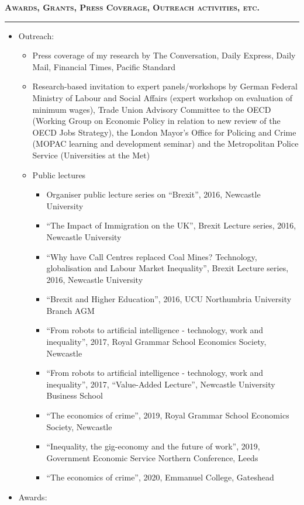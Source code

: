 \documentclass[10pt,pdftex,a4paper,oneside]{article}
\begin{document}
\textbf{\textsc{Awards, Grants, Press Coverage, Outreach activities, etc.}}
\vspace{.5ex}
\hrule
\begin{itemize}[noitemsep,nolistsep]
\item Outreach: 
\begin{itemize}[noitemsep,nolistsep]
	\item Press coverage of my research by The Conversation, Daily Express, Daily Mail, Financial Times, Pacific Standard
	\item Research-based invitation to expert panels/workshops by German Federal Ministry of Labour and Social Affairs (expert workshop on evaluation of minimum wages), Trade Union Advisory Committee to the OECD (Working Group on Economic Policy in relation to new review of the OECD Jobs Strategy), the London Mayor's Office for Policing and Crime (MOPAC learning and development seminar) and the Metropolitan Police Service (Universities at the Met)
	\item Public lectures
	\begin{itemize}	
	\item Organiser public lecture series on ``Brexit'', 2016, Newcastle University
	\item ``The Impact of Immigration on the UK'', Brexit Lecture series, 2016, Newcastle University
	\item ``Why have Call Centres replaced Coal Mines? Technology, globalisation and Labour Market Inequality'', Brexit Lecture series, 2016, Newcastle University
	\item ``Brexit and Higher Education'', 2016, UCU Northumbria University Branch AGM
	\item ``From robots to artificial intelligence - technology, work and inequality'', 2017, Royal Grammar School Economics Society, Newcastle
	\item ``From robots to artificial intelligence - technology, work and inequality'', 2017, ``Value-Added Lecture'', Newcastle University Business School
	\item  ``The economics of crime'', 2019, Royal Grammar School Economics Society, Newcastle
	\item ``Inequality, the gig-economy and the future of work'', 2019, Government Economic Service Northern Conference, Leeds
	\item  ``The economics of crime'', 2020, Emmanuel College, Gateshead
	\end{itemize}
\end{itemize}
\item Awards:

\end{itemize}
\end{document}
